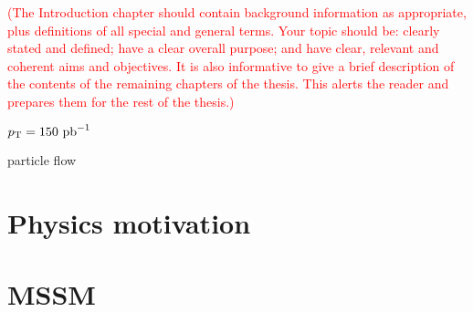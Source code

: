 \textcolor{red}{(The Introduction chapter should contain background information as appropriate, plus definitions of all special and general terms. Your topic should be: clearly stated and defined; have a clear overall purpose; and have clear, relevant and coherent aims and objectives. It is also informative to give a brief description of the contents of the remaining chapters of the thesis. This alerts the reader and prepares them for the rest of the thesis.)}



$p_{\mathrm{T}} = 150\,\mbox{\ensuremath{\,\text{pb}^\text{$-$1}}}$

particle flow~\cite{CMS-PRF-14-001}

\section{Physics motivation}


\section{MSSM}

